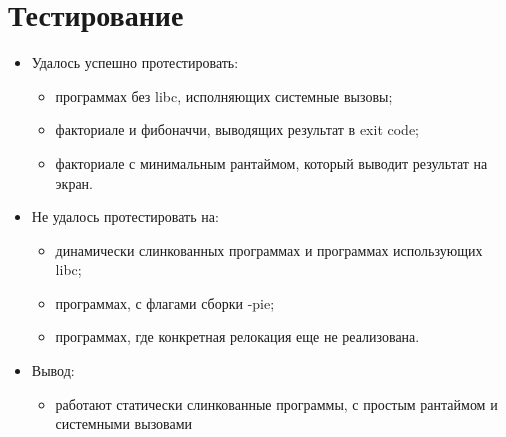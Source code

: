 
\section{Тестирование}
 \begin{itemize}
    \item Удалось успешно протестировать:
          \begin{itemize}
            \item программах без libc, исполняющих системные вызовы;
            \item факториале и фибоначчи, выводящих результат в exit code;
            \item факториале с минимальным рантаймом, который выводит результат на экран.
          \end{itemize}
    \item Не удалось протестировать на:
          \begin{itemize}
            \item динамически слинкованных программах и программах использующих libc;
            \item программах, с флагами сборки -pie;
            \item программах, где конкретная релокация еще не реализована.
          \end{itemize}
    \item Вывод:
          \begin{itemize}
            \item работают статически слинкованные программы, с простым рантаймом и системными вызовами
          \end{itemize}
 \end{itemize}



